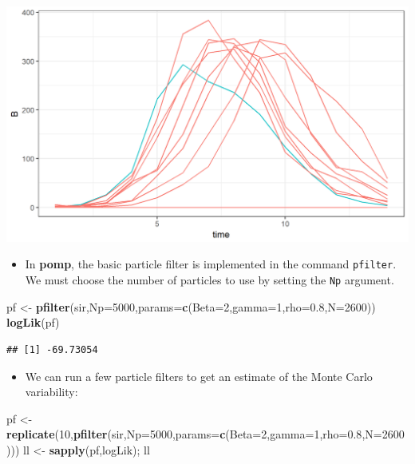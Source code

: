 \documentclass[]{article}
\newenvironment{Shaded}{\begin{snugshade}}{\end{snugshade}}
\newcommand{\KeywordTok}[1]{\textcolor[rgb]{0.13,0.29,0.53}{\textbf{#1}}}
\newcommand{\DataTypeTok}[1]{\textcolor[rgb]{0.13,0.29,0.53}{#1}}
\newcommand{\DecValTok}[1]{\textcolor[rgb]{0.00,0.00,0.81}{#1}}
\newcommand{\FloatTok}[1]{\textcolor[rgb]{0.00,0.00,0.81}{#1}}
\newcommand{\StringTok}[1]{\textcolor[rgb]{0.31,0.60,0.02}{#1}}
\newcommand{\NormalTok}[1]{#1}
\providecommand{\tightlist}{%
  \setlength{\itemsep}{0pt}\setlength{\parskip}{0pt}}
\begin{document}
\begin{center}\includegraphics{figure/notes12-sir-sim1-1} \end{center}

\begin{itemize}
\tightlist
\item
  In \textbf{pomp}, the basic particle filter is implemented in the
  command \texttt{pfilter}. We must choose the number of particles to
  use by setting the \texttt{Np} argument.
\end{itemize}

\begin{Shaded}
\begin{Highlighting}[]
\NormalTok{pf <-}\StringTok{ }\KeywordTok{pfilter}\NormalTok{(sir,}\DataTypeTok{Np=}\DecValTok{5000}\NormalTok{,}\DataTypeTok{params=}\KeywordTok{c}\NormalTok{(}\DataTypeTok{Beta=}\DecValTok{2}\NormalTok{,}\DataTypeTok{gamma=}\DecValTok{1}\NormalTok{,}\DataTypeTok{rho=}\FloatTok{0.8}\NormalTok{,}\DataTypeTok{N=}\DecValTok{2600}\NormalTok{))}
\KeywordTok{logLik}\NormalTok{(pf)}
\end{Highlighting}
\end{Shaded}

\begin{verbatim}
## [1] -69.73054
\end{verbatim}

\begin{itemize}
\tightlist
\item
  We can run a few particle filters to get an estimate of the Monte
  Carlo variability:
\end{itemize}

\begin{Shaded}
\begin{Highlighting}[]
\NormalTok{pf <-}\StringTok{ }\KeywordTok{replicate}\NormalTok{(}\DecValTok{10}\NormalTok{,}\KeywordTok{pfilter}\NormalTok{(sir,}\DataTypeTok{Np=}\DecValTok{5000}\NormalTok{,}\DataTypeTok{params=}\KeywordTok{c}\NormalTok{(}\DataTypeTok{Beta=}\DecValTok{2}\NormalTok{,}\DataTypeTok{gamma=}\DecValTok{1}\NormalTok{,}\DataTypeTok{rho=}\FloatTok{0.8}\NormalTok{,}\DataTypeTok{N=}\DecValTok{2600}\NormalTok{)))}
\NormalTok{ll <-}\StringTok{ }\KeywordTok{sapply}\NormalTok{(pf,logLik); ll}
\end{Highlighting}
\end{Shaded}
\end{document}
